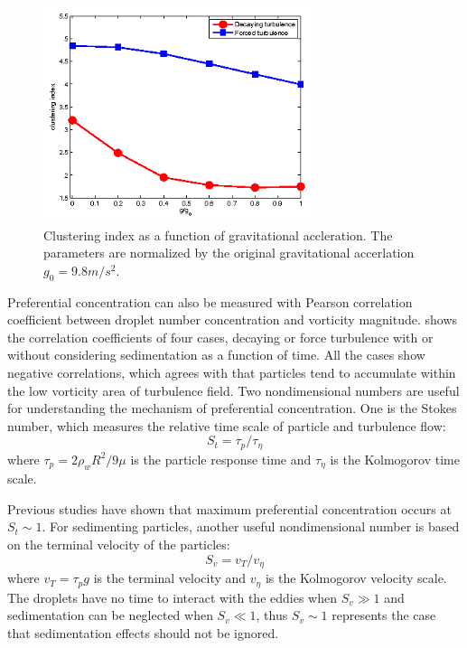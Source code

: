 \begin{figure}[H]\centering
\includegraphics[width=0.7\textwidth]{Figures/sedwithgravity}
\caption{Clustering index as a function of gravitational accleration. The parameters are normalized by the original gravitational accerlation $g_0 = 9.8m/s^2$.}\label{fig:sed_gravity}
\end{figure}

Preferential concentration can also be measured with Pearson correlation
coefficient between droplet number concentration and vorticity magnitude.
 shows the correlation coefficients of four cases,
decaying or force turbulence with or without considering sedimentation as a
function of time. All the cases show negative correlations, which agrees with
that particles tend to accumulate within the low vorticity area of turbulence
field. Two nondimensional numbers are useful for understanding the mechanism of
preferential concentration. One is the Stokes number, which measures the
relative time scale of particle and turbulence flow:
\begin{equation}
S_t = \tau_p/\tau_{\eta}
\end{equation}
where $\tau_p = 2\rho_wR^2/9\mu$ is the particle response time and
$\tau_{\eta}$ is the Kolmogorov time scale.

Previous studies \cite{Grabowski1999Comments,Vaillancourt2000Review} have shown
that maximum preferential concentration occurs at $S_t \sim 1$. For sedimenting
particles, another useful nondimensional number is based on the terminal
velocity of the particles:
\begin{equation}
S_v = v_T/v_{\eta}
\end{equation}
where $v_T = \tau_p g$ is the terminal velocity and $v_{\eta}$ is the
Kolmogorov velocity scale. The droplets have no time to interact with the
eddies when $S_v \gg 1$ and sedimentation can be neglected when $S_v \ll 1$,
thus $S_v \sim 1$ represents the case that sedimentation effects should not be
ignored.

